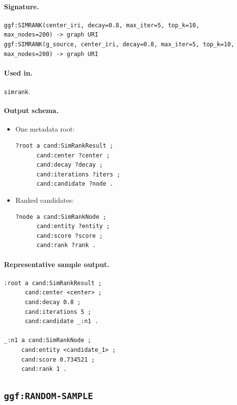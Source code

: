 \paragraph{Signature.}
\begin{verbatim}
ggf:SIMRANK(center_iri, decay=0.8, max_iter=5, top_k=10, max_nodes=200) -> graph URI
ggf:SIMRANK(g_source, center_iri, decay=0.8, max_iter=5, top_k=10, max_nodes=200) -> graph URI
\end{verbatim}

\paragraph{Used in.}
\texttt{simrank}.

\paragraph{Output schema.}
\begin{itemize}
\item One metadata root:
\begin{verbatim}
?root a cand:SimRankResult ;
      cand:center ?center ;
      cand:decay ?decay ;
      cand:iterations ?iters ;
      cand:candidate ?node .
\end{verbatim}
\item Ranked candidates:
\begin{verbatim}
?node a cand:SimRankNode ;
      cand:entity ?entity ;
      cand:score ?score ;
      cand:rank ?rank .
\end{verbatim}
\end{itemize}

\paragraph{Representative sample output.}
\begin{verbatim}
:root a cand:SimRankResult ;
      cand:center <center> ;
      cand:decay 0.8 ;
      cand:iterations 5 ;
      cand:candidate _:n1 .

_:n1 a cand:SimRankNode ;
     cand:entity <candidate_1> ;
     cand:score 0.734521 ;
     cand:rank 1 .
\end{verbatim}

\subsection{\texttt{ggf:RANDOM-SAMPLE}}
\label{subsec:ggf-random-sample}


